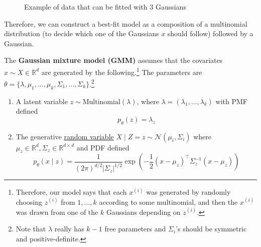 \documentclass{article}
\begin{document}
\begin{figure}[H]
    \caption{Example of data that can be fitted with 3 Gaussians}
  \end{figure}

  Therefore, we can construct a best-fit model as a composition of a multinomial distribution (to decide which one of the Gaussians $x$ should follow) followed by a Gaussian. 

  \begin{definition}
    \label{def:gaussian-mixture-model}
 
    The \textbf{Gaussian mixture model (GMM)} assumes that the covariates $x \sim X \in \mathbb{R}^d$ are generated by the following.\footnote{Therefore, our model says that each $x^{(i)}$ was generated by randomly choosing $z^{(i)}$ from ${1, \ldots, k}$ according to some multinomial, and then the $x^{(i)}$ was drawn from one of the $k$ Gaussians depending on $z^{(i)}$.} The parameters are $\theta = \{\lambda, \mu_1, \ldots, \mu_k, \Sigma_1, \ldots, \Sigma_k\}$.\footnote{Note that $\lambda$ really has $k-1$ free parameters and $\Sigma_i$'s should be symmetric and positive-definite.}

    \begin{enumerate}
      \item A latent variable $z \sim \mathrm{Multinomial}(\lambda)$, where $\lambda = (\lambda_1, \ldots, \lambda_k)$ with PMF defined 
      \begin{equation}
        p_\theta (z) = \lambda_z
      \end{equation}

      \item The generative \hyperref[prob-def:random-variable]{random variable} $X \mid Z = z \sim \mathcal{N}(\mu_i, \Sigma_i)$ where $\mu_z \in \mathbb{R}^d, \Sigma_z \in \mathbb{R}^{d \times d}$ and PDF defined 
      \begin{equation}
        p_\theta (x \mid z) = \frac{1}{(2\pi)^{d/2}|\Sigma_z|^{1/2}} \exp\left(-\frac{1}{2}(x-\mu_z)^\top\Sigma_z^{-1}(x-\mu_z)\right)
      \end{equation}
    \end{enumerate}
  \end{definition}
\end{document}
